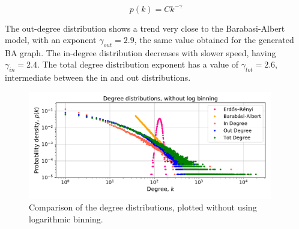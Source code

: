 \documentclass[11pt, twoside]{report}
\begin{document}
    \begin{equation}
      p(k) = C k^{-\gamma}
      \label{eq:power_law}
    \end{equation}

    The out-degree distribution shows a trend very close to the Barabasi-Albert model, with an exponent $\gamma_{out} = 2.9$, the same value obtained for the generated BA graph. The in-degree distribution decreases with slower speed, having $\gamma_{in} = 2.4$. The total degree distribution exponent has a value of $\gamma_{tot} = 2.6$, intermediate between the in and out distributions.


 \begin{figure}[hb]
      \centering
      \includegraphics[width=0.95\textwidth]{../../scripts/network_analysis/imgs/degree_distributions_nobinlog.pdf}
      \caption{Comparison of the degree distributions, plotted without using logarithmic binning.}
      \label{fig:degree_nolog}
    \end{figure}
\end{document}
